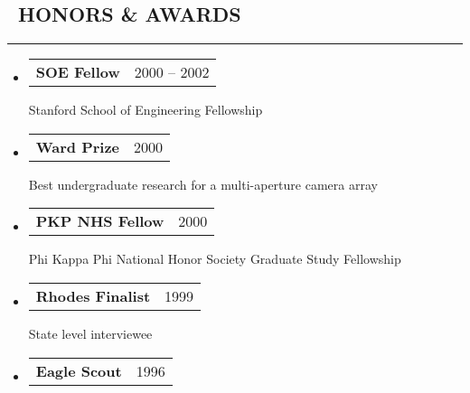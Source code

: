 \documentclass[10pt,letterpaper]{article}
\makeatletter
\newenvironment{resumesection}[1]
{%
    \subsection*{\ #1}
    \vspace{-0.4em}
    \begin{samepage}
    \hrule
    \end{samepage}
    \vspace{+0.4em}
    \begin{itemize}[leftmargin=0.15cm]
        \parskip=0.1em
}%
{%
    \end{itemize}
}%
\newcommand{\headerrowx}[2]
{\item[] \begin{tabular*}{\linewidth}{l@{\extracolsep{\fill}}r}
	#1 &
	#2 \\
\end{tabular*}}
\newcommand{\lminiw}{0.375}
\newcommand{\cminiw}{0.075}
\makeatother
\begin{document}
\begin{minipage}[t]{\lminiw\textwidth}
\begin{resumesection}{HONORS \& AWARDS}
    Stanford Graduate Fellowship
    
    \headerrowx{\textbf{SOE Fellow}}{2000 -- 2002}
    
    Stanford School of Engineering Fellowship
    
    \headerrowx{\textbf{Ward Prize}}{2000}
    
    Best undergraduate research for a multi-aperture camera array
    
    \headerrowx{\textbf{PKP NHS Fellow}}{2000}
    
    Phi Kappa Phi National Honor Society Graduate Study Fellowship
    
    \headerrowx{\textbf{Rhodes Finalist}}{1999}
    
    State level interviewee
    
    \headerrowx{\textbf{Eagle Scout}}                       {1996}
\end{resumesection}

\end{minipage}
\begin{minipage}[t]{\cminiw\textwidth}
\end{minipage}\hfill
\end{document}
